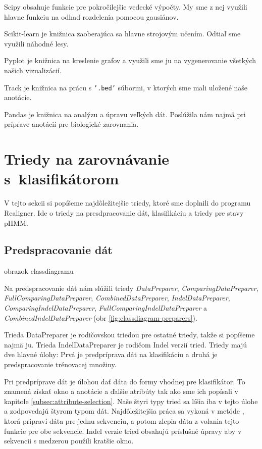 Scipy obsahuje funkcie pre pokročilejšie vedecké výpočty. My sme z nej využili hlavne funkciu na odhad rozdelenia pomocou gausiánov.

Scikit-learn je knižnica zaoberajúca sa hlavne strojovým učením. Odtiaľ sme využili náhodné lesy.

Pyplot je knižnica na kreslenie grafov a využili sme ju na vygenerovanie všetkých našich vizualizácií.

Track je knižnica na prácu s {\tt '.bed'} súbormi, v ktorých sme mali uložené naše anotácie.

Pandas je knižnica na analýzu a úpravu veľkých dát. Poslúžila nám najmä pri príprave anotácií pre biologické zarovnania.

\section[Triedy na zarovnávanie s klas.]{Triedy na zarovnávanie s~klasifikátorom}

V tejto sekcii si popíšeme najdôležitejšie triedy, ktoré sme doplnili do programu Realigner. Ide o triedy na presdpracovanie dát, klasifikáciu a triedy pre stavy pHMM.

\subsection{Predspracovanie dát}

\todo obrazok classdiagramu

Na predspracovanie dát nám slúžili triedy \textit{DataPreparer}, \textit{ComparingDataPreparer}, \textit{FullComparingDataPreparer}, \textit{CombinedDataPreparer},
\textit{IndelDataPreparer}, \textit{ComparingIndelDataPreparer}, \textit{FullComparingIndelDataPreparer} a \textit{CombinedIndelDataPreparer} (obr \ref{fig:classdiagram-preparers}).

Trieda DataPreparer je rodičovskou triedou pre ostatné triedy, takže si popíšeme najmä ju. Trieda IndelDataPreparer je rodičom Indel verzií tried. Triedy majú dve hlavné úlohy: Prvá je predpríprava dát na klasifikáciu a druhá je predspracovanie trénovacej množiny.

Pri predpríprave dát je úlohou dať dáta do formy vhodnej pre klasifikátor. To znamená získať okno a anotácie a ďalšie atribúty tak ako sme ich popísali v kapitole \ref{subsec:attribute-selection}. Naše štyri typy tried sa líšia iba v tejto úlohe a zodpovedajú štyrom typom dát. Najdôležitejšia práca sa vykoná v metóde , ktorá pripraví dáta pre jednu sekvenciu, a potom zlepia dáta z volania tejto funkcie pre obe sekvencie. Indel verzie tried obsahujú príslušné úpravy aby v sekvencii s medzerou použili kratšie okno.

